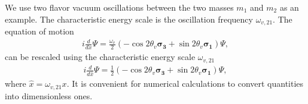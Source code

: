 We use two flavor vacuum oscillations between the two masses $m_1$ and $m_2$ as an example. The characteristic energy scale is the oscillation frequency $\omega_{v,21}$. The equation of motion
\begin{align}
   i\frac{d}{d x} \Psi = \frac{\omega_v}{2}(-\cos 2\theta_v \boldsymbol{\sigma_3} + \sin 2\theta_v \boldsymbol{\sigma_1}) \Psi,
\end{align}
can be rescaled using the characteristic energy scale $\omega_{v,21}$
\begin{align}
   i\frac{d}{d \hat x} \Psi = \frac{1}{2}(-\cos 2\theta_v \boldsymbol{\sigma_3} + \sin 2\theta_v \boldsymbol{\sigma_1})\Psi ,
\end{align}
where $\hat x = \omega_{v,21} x$. It is convenient for numerical calculations to convert quantities into dimensionless ones.

